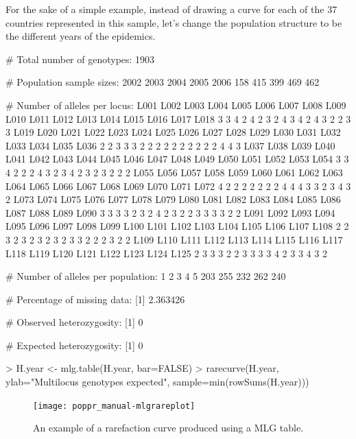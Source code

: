 \documentclass[letterpaper]{article}
\begin{document}
For the sake of a simple example, instead of drawing a curve for each of the 37 countries represented in this sample, let's change the population structure to be the different years of the epidemics. 
\begin{Schunk}
\begin{Soutput}
 # Total number of genotypes:  1903 

 # Population sample sizes:  
2002 2003 2004 2005 2006 
 158  415  399  469  462 

 # Number of alleles per locus:  
L001 L002 L003 L004 L005 L006 L007 L008 L009 L010 L011 L012 L013 L014 L015 L016 L017 L018 
   3    3    4    2    4    2    3    2    4    3    4    2    4    3    2    2    3    3 
L019 L020 L021 L022 L023 L024 L025 L026 L027 L028 L029 L030 L031 L032 L033 L034 L035 L036 
   2    2    3    3    3    2    2    2    2    2    2    2    2    2    2    4    4    3 
L037 L038 L039 L040 L041 L042 L043 L044 L045 L046 L047 L048 L049 L050 L051 L052 L053 L054 
   3    3    4    2    2    2    4    3    2    3    4    2    3    2    3    2    2    2 
L055 L056 L057 L058 L059 L060 L061 L062 L063 L064 L065 L066 L067 L068 L069 L070 L071 L072 
   4    2    2    2    2    2    2    2    4    4    4    3    3    2    3    4    3    2 
L073 L074 L075 L076 L077 L078 L079 L080 L081 L082 L083 L084 L085 L086 L087 L088 L089 L090 
   3    3    3    3    2    3    2    4    2    3    2    2    3    3    3    3    2    2 
L091 L092 L093 L094 L095 L096 L097 L098 L099 L100 L101 L102 L103 L104 L105 L106 L107 L108 
   2    2    3    2    3    2    3    2    3    2    3    3    2    2    2    3    2    2 
L109 L110 L111 L112 L113 L114 L115 L116 L117 L118 L119 L120 L121 L122 L123 L124 L125 
   2    3    3    3    2    2    3    3    3    3    4    2    3    3    4    3    2 

 # Number of alleles per population:  
  1   2   3   4   5 
203 255 232 262 240 

 # Percentage of missing data:  
[1] 2.363426

 # Observed heterozygosity:  
[1] 0

 # Expected heterozygosity:  
[1] 0
\end{Soutput}
\end{Schunk}
\begin{Schunk}
\begin{Sinput}
> H.year <- mlg.table(H.year, bar=FALSE)
> rarecurve(H.year, ylab="Multilocus genotypes expected", sample=min(rowSums(H.year)))
\end{Sinput}
\end{Schunk}
\begin{figure}[h!]
  \centering
  \caption{\footnotesize An example of a rarefaction curve produced using a MLG table.}
  \label{rarecurve}
\texttt{[image: poppr\_manual-mlgrareplot]}
\end{figure}
\end{document}
